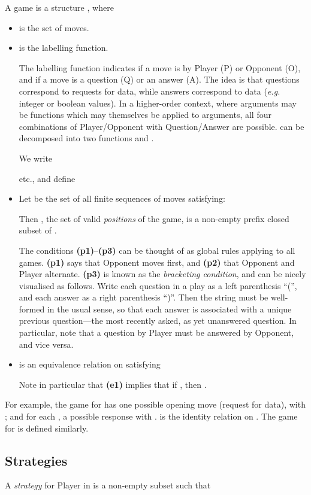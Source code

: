 \documentclass[11pt]{article}
\begin{document}
A game is a structure , where
\begin{itemize}
\item  is the set of moves.
\item  is the
  labelling function.

  The labelling function indicates if a move is by Player (P) or
  Opponent (O), and if a move is a question (Q) or an answer (A). The
  idea is that questions correspond to requests for data, while
  answers correspond to data
  ({\em e.g.} integer or boolean values). In a higher-order
  context, where arguments may be functions which may themselves be
  applied to arguments, all four combinations of Player/Opponent with
  Question/Answer are possible.  can be decomposed into
  two functions  and
  .


  We write
 
etc., and define



\item Let  be the set of all finite sequences  of
  moves satisfying:

Then , the set of valid {\em positions} of the game, is a
non-empty prefix closed subset of .

The conditions {\bf (p1)}--{\bf (p3)} can be thought of as global rules
applying to all games. {\bf (p1)} says that Opponent moves first, and
{\bf (p2)}  that Opponent and Player alternate. {\bf (p3)} is known as
the {\em bracketing condition}, and can be nicely visualised as follows.
Write each
question in a play as a left parenthesis ``('', and each answer as a
right parenthesis ``)''.  Then the string must be well-formed in the
usual sense, so that each answer is associated with a unique previous
question---the most recently asked, as yet unanswered question.  In
particular, note that a question by Player must be answered by
Opponent, and vice versa.

\item
 is an equivalence relation on  satisfying

Note in particular that {\bf (e1)} implies that if , then .
\end{itemize}
For example, the game for  has one possible opening move
 (request for data), with ; and for each , a possible response  with
.
 is the identity relation on .
The game for  is defined similarly.

\subsection{Strategies}
A {\em strategy} for Player in  is a non-empty subset
 such that
\end{document}
